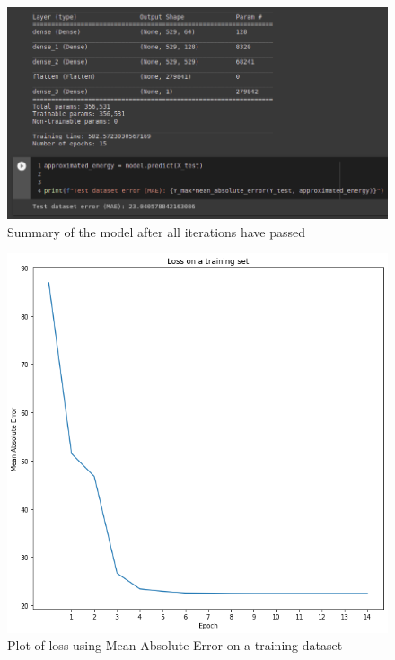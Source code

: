 \documentclass[a4paper,oneside,openright,11pt]{book}
\begin{document}
\begin{figure}[h!]
\centering
\includegraphics[scale=0.5]{DocumentFigures/ZdjeciaWalidacja/MAEtest.png}
\caption{Summary of the model after all iterations have passed}
\end{figure}




\begin{figure}[h!]
\centering
\includegraphics[scale=0.8]{DocumentFigures/ZdjeciaWalidacja/Losstraining.png}
\caption{Plot of loss using Mean Absolute Error on a training dataset}
\end{figure}
\end{document}
